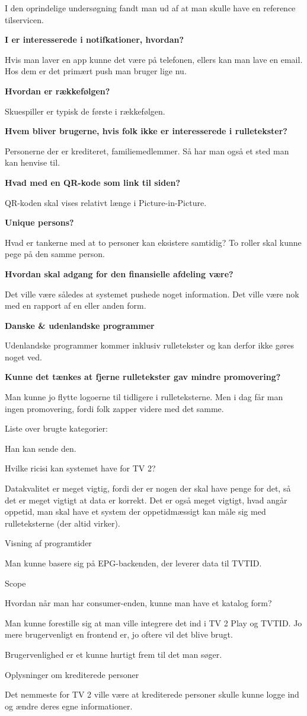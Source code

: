 I den oprindelige undersøgning fandt man ud af at man skulle have en reference tilservicen.

\textbf{I er interesserede i notifkationer, hvordan?}

Hvis man laver en app kunne det være på telefonen, ellers kan man lave en email. Hos dem er det primært push man bruger lige nu.

\textbf{Hvordan er rækkefølgen?}

Skuespiller er typisk de første i rækkefølgen.

\textbf{Hvem bliver brugerne, hvis folk ikke er interesserede i rulletekster?}

Personerne der er krediteret, familiemedlemmer. Så har man også et sted man kan henvise til.

\textbf{Hvad med en QR-kode som link til siden?}

QR-koden skal vises relativt længe i Picture-in-Picture.

\textbf{Unique persons?}

Hvad er tankerne med at to personer kan eksistere samtidig? To roller skal kunne pege på den samme person.

\textbf{Hvordan skal adgang for den finansielle afdeling være?}

Det ville være således at systemet pushede noget information. Det ville være nok med en rapport af en eller anden form.

\textbf{Danske & udenlandske programmer} 

Udenlandske programmer kommer inklusiv rulletekster og kan derfor ikke gøres noget ved.

\textbf{Kunne det tænkes at fjerne rulletekster gav mindre promovering?}

Man kunne jo flytte logoerne til tidligere i rulleteksterne. Men i dag får man ingen promovering, fordi folk zapper videre med det samme.

Liste over brugte kategorier:

Han kan sende den.

Hvilke ricisi kan systemet have for TV 2?

Datakvalitet er meget vigtig, fordi der er nogen der skal have penge for det, så det er meget vigtigt at data er korrekt. Det er også meget vigtigt, hvad angår oppetid, man skal have et system der oppetidmæssigt kan måle sig med rulleteksterne (der altid virker).

Visning af programtider

Man kunne basere sig på EPG-backenden, der leverer data til TVTID.

Scope

Hvordan når man har consumer-enden, kunne man have et katalog form?

Man kunne forestille sig at man ville integrere det ind i TV 2 Play og TVTID. Jo mere brugervenligt en frontend er, jo oftere vil det blive brugt.

Brugervenlighed er et kunne hurtigt frem til det man søger.

Oplysninger om krediterede personer

Det nemmeste for TV 2 ville være at krediterede personer skulle kunne logge ind og ændre deres egne informationer.
